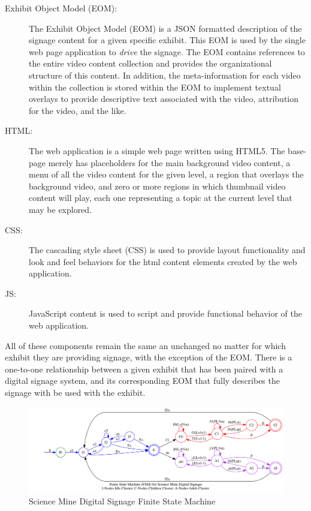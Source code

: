 \documentclass[10pt]{article}
\begin{document}
\begin{description}
\begin{description}
		\item[Exhibit Object Model (EOM):] The Exhibit Object Model (EOM) is a JSON formatted description of the signage content for a given specific exhibit. This EOM is used by the single web page application to \emph{drive\/} the signage. The EOM contains references to the entire video content collection and provides the organizational structure of this content. In addition, the meta-information for each video within the collection is stored within the EOM to implement textual overlays to provide descriptive text associated with the video, attribution for the video, and the like. 
		
		\item[HTML:] The web application is a simple web page written using HTML5. The base-page merely has placeholders for the main background video content, a menu of all the video content for the given level, a region that overlays the background video, and zero or more regions in which thumbnail video content will play, each one representing a topic at the current level that may be explored. 
		
		\item[CSS:] The cascading style sheet (CSS) is used to provide layout functionality and look and feel behaviors for the html content elements created by the web application.
		
		\item[JS:] JavaScript content is used to script and provide functional behavior of the web application.
	\end{description}
\end{description}

All of these components remain the same an unchanged no matter for which exhibit they are providing signage, with the exception of the EOM. There is a one-to-one relationship between a given exhibit that has been paired with a digital signage system, and its corresponding EOM that fully describes the signage with be used with the exhibit.

\begin{figure} \centering 
	\caption{Science Mine Digital Signage Finite State Machine} \label{fig:FSM}
	\includegraphics[width=\textwidth]{SMDS-fsm.png} 
\end{figure}
\end{document}
